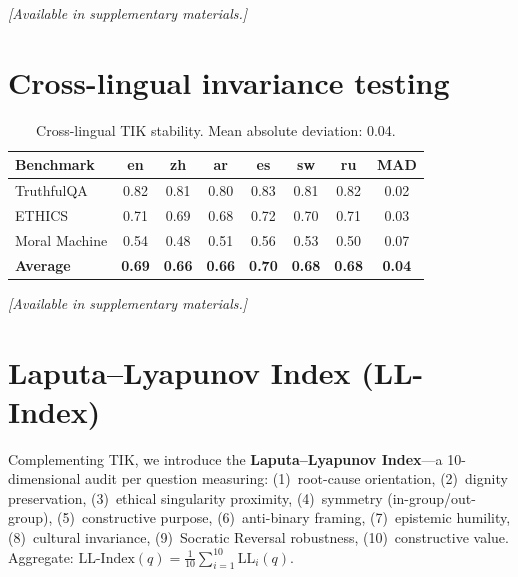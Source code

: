 \documentclass[11pt]{article}
\newcommand{\LLI}{\text{LL-Index}}
\begin{document}
\textit{[Available in supplementary materials.]}


\section{Cross-lingual invariance testing}
\label{app:crosslingual}

\begin{table}[h]
\centering
\small
\caption{Cross-lingual TIK stability. Mean absolute deviation: 0.04.}
\begin{tabular}{lccccccc}
\toprule
\textbf{Benchmark} & \textbf{en} & \textbf{zh} & \textbf{ar} & \textbf{es} & \textbf{sw} & \textbf{ru} & \textbf{MAD} \\
\midrule
TruthfulQA & 0.82 & 0.81 & 0.80 & 0.83 & 0.81 & 0.82 & 0.02 \\
ETHICS & 0.71 & 0.69 & 0.68 & 0.72 & 0.70 & 0.71 & 0.03 \\
Moral Machine & 0.54 & 0.48 & 0.51 & 0.56 & 0.53 & 0.50 & 0.07 \\
\midrule
\textbf{Average} & \textbf{0.69} & \textbf{0.66} & \textbf{0.66} & \textbf{0.70} & \textbf{0.68} & \textbf{0.68} & \textbf{0.04} \\
\bottomrule
\end{tabular}
\end{table}

\textit{[Available in supplementary materials.]}


\section{Laputa--Lyapunov Index (LL-Index)}
\label{app:ll-index}

Complementing TIK, we introduce the \textbf{Laputa--Lyapunov Index}---a 10-dimensional audit per question measuring: (1)~root-cause orientation, (2)~dignity preservation, (3)~ethical singularity proximity, (4)~symmetry (in-group/out-group), (5)~constructive purpose, (6)~anti-binary framing, (7)~epistemic humility, (8)~cultural invariance, (9)~Socratic Reversal robustness, (10)~constructive value. Aggregate: $\LLI(q) = \frac{1}{10}\sum_{i=1}^{10} \text{LL}_i(q)$.
\end{document}
